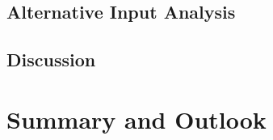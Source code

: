 \documentclass[12pt,a4paper]{article}
\begin{document}
\subsection{Alternative Input Analysis}
\label{04_05_alternative_input_analysis}


\subsection{Discussion}
\label{04_06_discussion}



\section{Summary and Outlook}
\label{05_summary_and_outlook}


\newpage
\printbibliography
\end{document}
